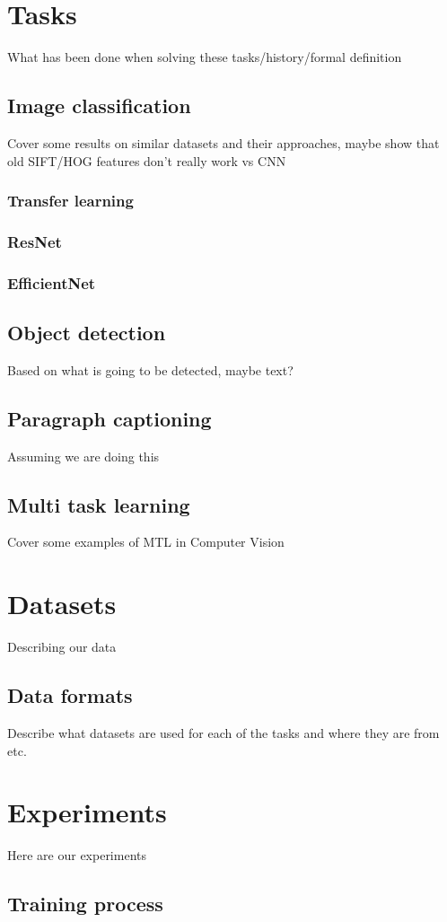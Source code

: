 \chapter{Tasks}
What has been done when solving these tasks/history/formal definition
\section{Image classification}
Cover some results on similar datasets and their approaches, maybe show that old SIFT/HOG features don't really work vs CNN
\subsection{Transfer learning}
\subsection{ResNet}
\subsection{EfficientNet}
\section{Object detection}
Based on what is going to be detected, maybe text?
\section{Paragraph captioning}
Assuming we are doing this
\section{Multi task learning}
Cover some examples of MTL in Computer Vision

\chapter{Datasets}
Describing our data
\section{Data formats}
Describe what datasets are used for each of the tasks and where they are from etc.

\chapter{Experiments}
Here are our experiments
\section{Training process}
